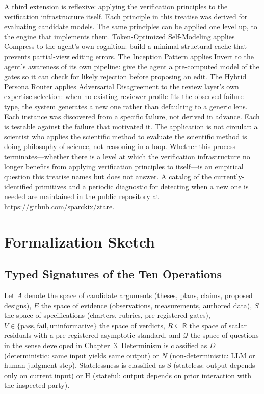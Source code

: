 \documentclass[11pt]{article}
\begin{document}
A third extension is reflexive: applying the verification principles to the verification infrastructure itself. Each principle in this treatise was derived for evaluating candidate models. The same principles can be applied one level up, to the engine that implements them. Token-Optimized Self-Modeling applies Compress to the agent's own cognition: build a minimal structural cache that prevents partial-view editing errors. The Inception Pattern applies Invert to the agent's awareness of its own pipeline: give the agent a pre-computed model of the gates so it can check for likely rejection before proposing an edit. The Hybrid Persona Router applies Adversarial Disagreement to the review layer's own expertise selection: when no existing reviewer profile fits the observed failure type, the system generates a new one rather than defaulting to a generic lens. Each instance was discovered from a specific failure, not derived in advance. Each is testable against the failure that motivated it. The application is not circular: a scientist who applies the scientific method to evaluate the scientific method is doing philosophy of science, not reasoning in a loop. Whether this process terminates---whether there is a level at which the verification infrastructure no longer benefits from applying verification principles to itself---is an empirical question this treatise names but does not answer. A catalog of the currently-identified primitives and a periodic diagnostic for detecting when a new one is needed are maintained in the public repository at \url{https://github.com/sparckix/ztare}.




\appendix
\section{Formalization Sketch}

\subsection{Typed Signatures of the Ten Operations}

Let $A$ denote the space of candidate arguments (theses, plans, claims, proposed designs), $E$ the space of evidence (observations, measurements, authored data), $S$ the space of specifications (charters, rubrics, pre-registered gates), $V \in \{\text{pass}, \text{fail}, \text{uninformative}\}$ the space of verdicts, $R \subseteq \mathbb{R}$ the space of scalar residuals with a pre-registered asymptotic standard, and $\mathcal{Q}$ the space of questions in the sense developed in Chapter~3. Determinism is classified as $D$ (deterministic: same input yields same output) or $N$ (non-deterministic: LLM or human judgment step). Statelessness is classified as $\mathrm{S}$ (stateless: output depends only on current input) or $\mathrm{H}$ (stateful: output depends on prior interaction with the inspected party).
\end{document}
